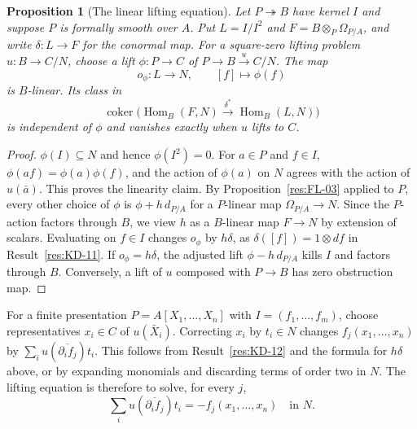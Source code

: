 \documentclass[11pt,oneside,openany]{book}
\newtheorem{proposition}[theorem]{Proposition}
\theoremstyle{definition}
\theoremstyle{remark}
\begin{document}
\begin{proposition}[The linear lifting equation]\label{res:FL-06}
Let $P\twoheadrightarrow B$ have kernel $I$ and suppose $P$ is formally smooth
over $A$. Put $L=I/I^2$ and $F=B\otimes_P\Omega_{P/A}$, and write
$\delta:L\to F$ for the conormal map. For a square-zero lifting problem
$u:B\to C/N$, choose a lift $\phi:P\to C$ of $P\to B\xrightarrow{u} C/N$.
The map
\[
  o_\phi:L\longrightarrow N,\qquad [f]\longmapsto\phi(f)
\]
is $B$-linear. Its class in
\[
  \operatorname{coker}\!\bigl(
     \operatorname{Hom}_B(F,N)\xrightarrow{\delta^*}
       \operatorname{Hom}_B(L,N)\bigr)
\]
is independent of $\phi$ and vanishes exactly when $u$ lifts to $C$.
\end{proposition}
\begin{proof}
$\phi(I)\subseteq N$ and hence $\phi(I^2)=0$. For $a\in P$ and $f\in I$,
$\phi(af)=\phi(a)\phi(f)$, and the action of $\phi(a)$ on $N$ agrees
with the action of $u(\bar a)$. This proves the linearity claim. By
Proposition~\ref{res:FL-03} applied to $P$, every other choice of
$\phi$ is $\phi+h\,d_{P/A}$ for a $P$-linear map $\Omega_{P/A}\to N$.
Since the $P$-action factors through $B$, we view $h$ as a $B$-linear map
$F\to N$ by extension of scalars. Evaluating on $f\in I$ changes $o_\phi$ by
$h\delta$, as $\delta([f])=1\otimes df$ in Result~\ref{res:KD-11}.
If $o_\phi=h\delta$, the adjusted lift $\phi-h\,d_{P/A}$ kills $I$ and
factors through $B$. Conversely, a lift of $u$ composed with $P\to B$ has
zero obstruction map.
\end{proof}

For a finite presentation $P=A[X_1,\ldots,X_n]$ with
$I=(f_1,\ldots,f_m)$, choose representatives $x_i\in C$ of $u(\bar X_i)$.
Correcting $x_i$ by $t_i\in N$ changes $f_j(x_1,\ldots,x_n)$ by
$\sum_i u(\overline{\partial_i f_j})t_i$. This follows from
Result~\ref{res:KD-12} and the formula for $h\delta$ above, or by expanding
monomials and discarding terms of order two in $N$. The lifting equation is
therefore to solve, for every $j$,
\[
  \sum_i u(\overline{\partial_i f_j})t_i=-f_j(x_1,\ldots,x_n)
  \quad\text{in }N .
\]
\end{document}
